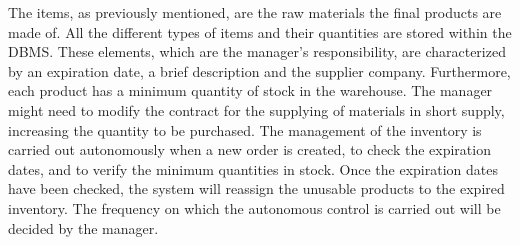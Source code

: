 The items, as previously mentioned, are the raw materials the final products are made of. All the different types of items and their quantities are stored within the DBMS. These elements, which are the manager's responsibility, are characterized by an expiration date, a brief description and the supplier company. Furthermore, each product has a minimum quantity of stock in the warehouse. The manager might need to modify the contract for the supplying of materials in short supply, increasing the quantity to be purchased. The management of the inventory is carried out autonomously when a new order is created, to check the expiration dates, and to verify the minimum quantities in stock. Once the expiration dates have been checked, the system will reassign the unusable products to the expired inventory. The frequency on which the autonomous control is carried out will be decided by the manager.
%
%
%
%
